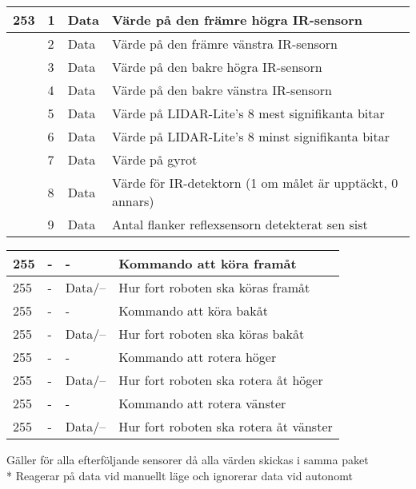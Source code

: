 \documentclass[11pt]{article}
\begin{document}
\begin{flushleft}
\begin{table}[h]
\begin{tabular}{|p{6em}|p{1em}|p{6em}|p{25em}|} \hline
253\text{*}  & 1 & Data & Värde på den främre högra IR-sensorn \\ \hline
 & 2 & Data & Värde på den främre vänstra IR-sensorn \\ \hline
 & 3 & Data & Värde på den bakre högra IR-sensorn \\ \hline
 & 4 & Data & Värde på den bakre vänstra IR-sensorn \\ \hline

 & 5 & Data &  Värde på LIDAR-Lite's 8 mest signifikanta bitar \\ \hline
 & 6 & Data &  Värde på LIDAR-Lite's 8 minst signifikanta bitar \\ \hline

 & 7 & Data & Värde på gyrot \\ \hline

 & 8 & Data & Värde för IR-detektorn (1 om målet är upptäckt, 0 annars) \\ \hline
  & 9 & Data & Antal flanker reflexsensorn detekterat sen sist\\ \hline
\end{tabular}

\begin{tabular}{|p{6em}|p{1em}|p{6em}|p{25em}|} \hline

255 & - & - & Kommando att köra framåt \\ \hline
255 & - & Data/--\text{**} & Hur fort roboten ska köras framåt \\ \hline
255 & - & - & Kommando att köra bakåt \\ \hline
255 & - & Data/--\text{**}  & Hur fort roboten ska köras bakåt \\ \hline
255 & - & - & Kommando att rotera höger \\ \hline
255 & - & Data/--\text{**}  & Hur fort roboten ska rotera åt höger  \\ \hline
255 & - & - & Kommando att rotera vänster \\ \hline
255 & - & Data/--\text{**} & Hur fort roboten ska rotera åt vänster  \\ \hline


\end{tabular}

\text{*} Gäller för alla efterföljande sensorer då alla värden skickas i samma paket \\*
\text{**} Reagerar på data vid manuellt läge och ignorerar data vid autonomt


\end{table}
\end{flushleft}
\end{document}
